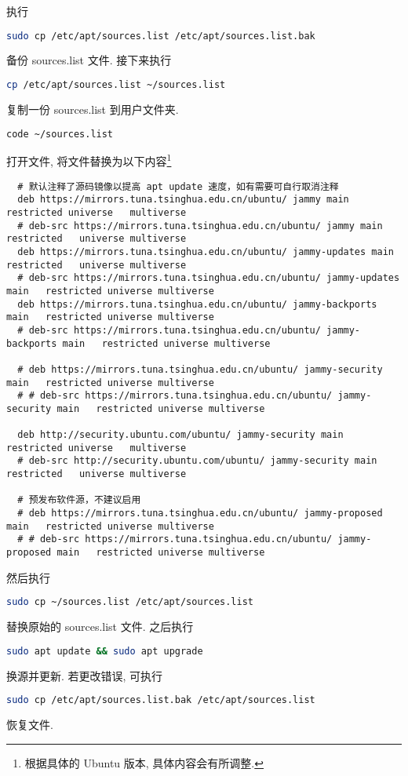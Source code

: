 \documentclass[fontset=founder]{ctexrep}
\begin{document}
执行
\begin{lstlisting}[language = bash]
  sudo cp /etc/apt/sources.list /etc/apt/sources.list.bak
\end{lstlisting}
备份 \textsf{sources.list} 文件.
接下来执行
\begin{lstlisting}[language = bash]
  cp /etc/apt/sources.list ~/sources.list
\end{lstlisting}
复制一份 \textsf{sources.list} 到用户文件夹.
\begin{lstlisting}[language = bash]
  code ~/sources.list
\end{lstlisting}
打开文件,
将文件替换为以下内容\footnote{根据具体的 Ubuntu 版本,
具体内容会有所调整.}
\begin{lstlisting}
  # 默认注释了源码镜像以提高 apt update 速度，如有需要可自行取消注释
  deb https://mirrors.tuna.tsinghua.edu.cn/ubuntu/ jammy main restricted universe   multiverse
  # deb-src https://mirrors.tuna.tsinghua.edu.cn/ubuntu/ jammy main restricted   universe multiverse
  deb https://mirrors.tuna.tsinghua.edu.cn/ubuntu/ jammy-updates main restricted   universe multiverse
  # deb-src https://mirrors.tuna.tsinghua.edu.cn/ubuntu/ jammy-updates main   restricted universe multiverse
  deb https://mirrors.tuna.tsinghua.edu.cn/ubuntu/ jammy-backports main   restricted universe multiverse
  # deb-src https://mirrors.tuna.tsinghua.edu.cn/ubuntu/ jammy-backports main   restricted universe multiverse
  
  # deb https://mirrors.tuna.tsinghua.edu.cn/ubuntu/ jammy-security main   restricted universe multiverse
  # # deb-src https://mirrors.tuna.tsinghua.edu.cn/ubuntu/ jammy-security main   restricted universe multiverse
  
  deb http://security.ubuntu.com/ubuntu/ jammy-security main restricted universe   multiverse
  # deb-src http://security.ubuntu.com/ubuntu/ jammy-security main restricted   universe multiverse
  
  # 预发布软件源，不建议启用
  # deb https://mirrors.tuna.tsinghua.edu.cn/ubuntu/ jammy-proposed main   restricted universe multiverse
  # # deb-src https://mirrors.tuna.tsinghua.edu.cn/ubuntu/ jammy-proposed main   restricted universe multiverse
\end{lstlisting}
然后执行
\begin{lstlisting}[language = bash]
  sudo cp ~/sources.list /etc/apt/sources.list
\end{lstlisting}
替换原始的 \textsf{sources.list} 文件.
之后执行
\begin{lstlisting}[language=bash]
  sudo apt update && sudo apt upgrade
\end{lstlisting}
换源并更新.
若更改错误,
可执行
\begin{lstlisting}[language=bash]
  sudo cp /etc/apt/sources.list.bak /etc/apt/sources.list
\end{lstlisting}
恢复文件.
\end{document}

